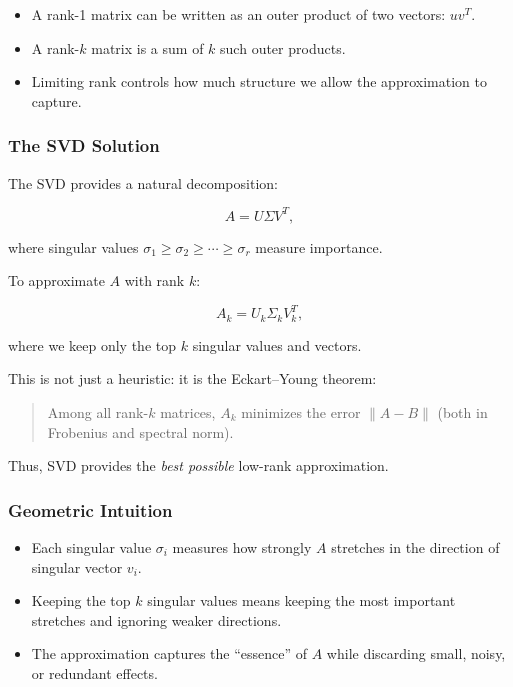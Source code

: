 \documentclass[
  letterpaper,
  DIV=11,
  numbers=noendperiod]{scrreprt}
\providecommand{\tightlist}{%
  \setlength{\itemsep}{0pt}\setlength{\parskip}{0pt}}
\begin{document}
\begin{itemize}
\tightlist
\item
  A rank-1 matrix can be written as an outer product of two vectors:
  \(uv^T\).
\item
  A rank-\(k\) matrix is a sum of \(k\) such outer products.
\item
  Limiting rank controls how much structure we allow the approximation
  to capture.
\end{itemize}

\subsubsection{The SVD Solution}\label{the-svd-solution}

The SVD provides a natural decomposition:

\[
A = U \Sigma V^T,
\]

where singular values
\(\sigma_1 \geq \sigma_2 \geq \cdots \geq \sigma_r\) measure importance.

To approximate \(A\) with rank \(k\):

\[
A_k = U_k \Sigma_k V_k^T,
\]

where we keep only the top \(k\) singular values and vectors.

This is not just a heuristic: it is the Eckart--Young theorem:

\begin{quote}
Among all rank-\(k\) matrices, \(A_k\) minimizes the error \(\|A - B\|\)
(both in Frobenius and spectral norm).
\end{quote}

Thus, SVD provides the \emph{best possible} low-rank approximation.

\subsubsection{Geometric Intuition}\label{geometric-intuition-6}

\begin{itemize}
\tightlist
\item
  Each singular value \(\sigma_i\) measures how strongly \(A\) stretches
  in the direction of singular vector \(v_i\).
\item
  Keeping the top \(k\) singular values means keeping the most important
  stretches and ignoring weaker directions.
\item
  The approximation captures the ``essence'' of \(A\) while discarding
  small, noisy, or redundant effects.
\end{itemize}
\end{document}
